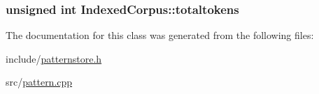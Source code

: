 \subsubsection[{totaltokens}]{\setlength{\rightskip}{0pt plus 5cm}unsigned int Indexed\+Corpus\+::totaltokens\hspace{0.3cm}{\ttfamily [protected]}}\label{classIndexedCorpus_a24358ff9fed75b73b775824288190dd9}


The documentation for this class was generated from the following files\+:\begin{DoxyCompactItemize}
\item 
include/\hyperlink{patternstore_8h}{patternstore.\+h}\item 
src/\hyperlink{pattern_8cpp}{pattern.\+cpp}\end{DoxyCompactItemize}

